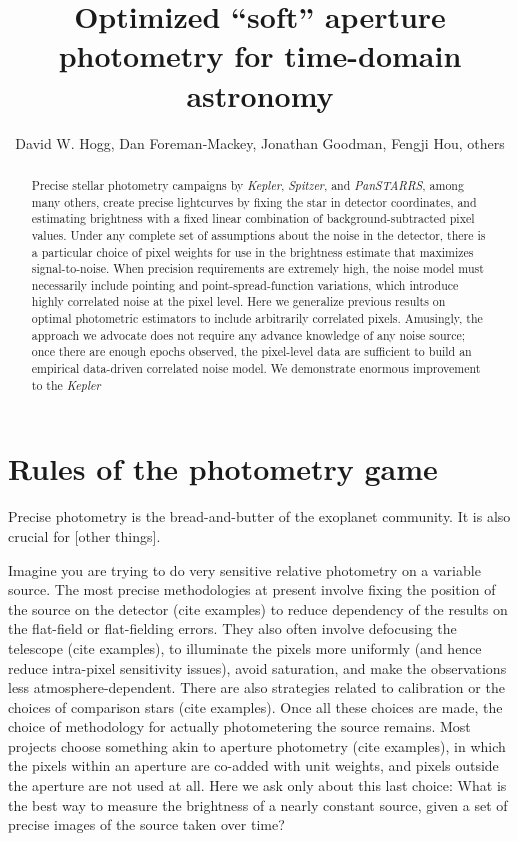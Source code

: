 \documentclass[12pt, letterpaper, preprint]{aastex}
\newcommand{\project}[1]{\textsl{#1}}
\begin{document}
\title{
  Optimized ``soft'' aperture photometry for time-domain astronomy
}
\author{
  David W. Hogg,
  Dan Foreman-Mackey,
  Jonathan Goodman,
  Fengji Hou,
  others
}

\begin{abstract}
Precise stellar photometry campaigns by \project{Kepler}, \project{Spitzer}, and \project{PanSTARRS},
  among many others,
  create precise lightcurves by fixing the star in detector coordinates,
  and estimating brightness with a fixed linear combination of background-subtracted pixel values.
Under any complete set of assumptions about the noise in the detector,
  there is a particular choice of pixel weights for use in the brightness estimate
  that maximizes signal-to-noise.
When precision requirements are extremely high,
  the noise model must necessarily include pointing and point-spread-function variations,
  which introduce highly correlated noise at the pixel level.
Here we generalize previous results on optimal photometric estimators
  to include arbitrarily correlated pixels.
Amusingly, the approach we advocate does not require any advance knowledge of any noise source;
  once there are enough epochs observed,
  the pixel-level data are sufficient to build an empirical data-driven correlated noise model.
We demonstrate enormous improvement to the \project{Kepler}
\end{abstract}


\section{Rules of the photometry game}

Precise photometry is the bread-and-butter of the exoplanet community.
It is also crucial for [other things].

Imagine you are trying to do very sensitive relative photometry on a variable source.
The most precise methodologies at present involve fixing the position of the source on the detector
  (cite examples)
  to reduce dependency of the results on the flat-field or flat-fielding errors.
They also often involve defocusing the telescope
  (cite examples),
  to illuminate the pixels more uniformly
  (and hence reduce intra-pixel sensitivity issues),
  avoid saturation,
  and make the observations less atmosphere-dependent.
There are also strategies related to calibration or the choices of comparison stars
  (cite examples).
Once all these choices are made,
  the choice of methodology for actually photometering the source remains.
Most projects choose something akin to aperture photometry
  (cite examples),
  in which the pixels within an aperture are co-added with unit weights,
  and pixels outside the aperture are not used at all.
Here we ask only about this last choice:
What is the best way to measure the brightness of a nearly constant source,
  given a set of precise images of the source taken over time?
\end{document}
